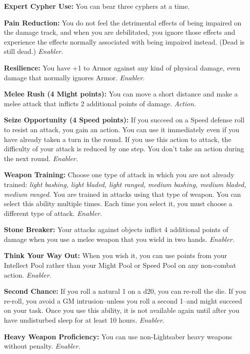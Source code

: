 \documentclass[a4paper,10pt,final,twocolumn,oneside]{book}
\newcommand{\itemAbility}[2]{\textcolor{25gray}{\textbullet\textbf{ #1:}}{ #2}\par}
\newcommand{\enabler}{\textit{ Enabler.}}
\newcommand{\action}{\textit{ Action.}}
\begin{document}
\itemAbility{Expert Cypher Use}{You can bear three cyphers at a time.}

\itemAbility{Pain Reduction}{You do not feel the detrimental effects of being impaired on the damage track, and when you are debilitated, you ignore those effects and experience the effects normally associated with being impaired instead. (Dead is still dead.)\enabler}

\itemAbility{Resilience}{You have +1 to Armor against any kind of physical damage, even damage that normally ignores Armor.\enabler}

\itemAbility{Melee Rush (4 Might points)}{You can move a short distance and make a melee attack that inflicts 2 additional points of damage.\action}

\itemAbility{Seize Opportunity (4 Speed points)}{If you succeed on a Speed defense roll to resist an attack, you gain an action. You can use it immediately even if you have already taken a turn in the round. If you use this action to attack, the difficulty of your attack is reduced by one step. You don’t take an action during the next round. \enabler}

\itemAbility{Weapon Training}{Choose one type of attack in which you are not already trained: \textit{light bashing, light bladed, light ranged, medium bashing, medium bladed, medium ranged}. You are trained in attacks using that type of weapon. You can select this ability multiple times. Each time you select it, you must choose a different type of attack.\enabler}

\itemAbility{Stone Breaker}{Your attacks against objects inflict 4 additional points of damage when you use a melee weapon that you wield in two hands.\enabler}

\itemAbility{Think Your Way Out}{When you wish it, you can use points from your Intellect Pool rather than your Might Pool or Speed Pool on any non-combat action.\enabler}

\itemAbility{Second Chance}{If you roll a natural 1 on a d20, you can re-roll the die. If you re-roll, you avoid a GM intrusion--unless you roll a second 1--and might succeed on your task. Once you use this ability, it is not available again until after you have undisturbed sleep for at least 10 hours.\enabler}

\itemAbility{Heavy Weapon Proficiency}{You can use non-Lightsaber heavy weapons without penalty.\enabler}

\end{document}
